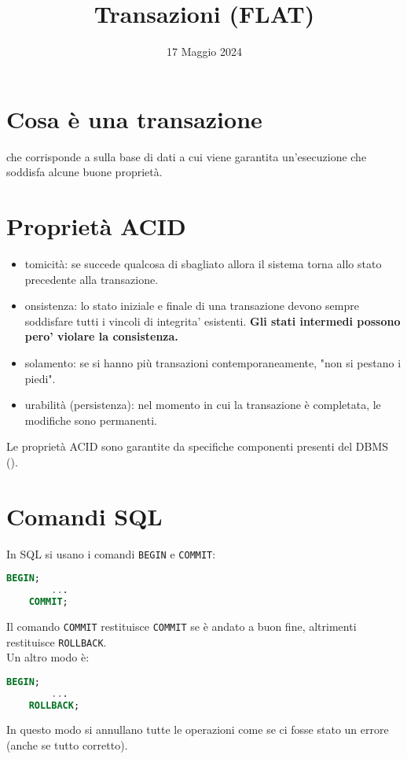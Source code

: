 \documentclass[12pt]{article}
\title{Transazioni (FLAT)}
\date{17 Maggio 2024}
\begin{document}
\maketitle
\section{Cosa è una transazione}
 che corrisponde a  sulla base di dati a cui viene garantita un'esecuzione che soddisfa alcune buone proprietà.
\section{Proprietà ACID}
\begin{itemize}
    \item {}tomicità: se succede qualcosa di sbagliato allora il sistema torna allo stato precedente alla transazione.
    \item {}onsistenza: lo stato iniziale e finale di una transazione devono sempre soddisfare tutti i vincoli di integrita' esistenti. \textbf{Gli stati intermedi possono pero' violare la consistenza.} 
    \item {}solamento: se si hanno più transazioni contemporaneamente, "non si pestano i piedi".
    \item {}urabilità (persistenza): nel momento in cui la transazione è completata, le modifiche sono permanenti. 
\end{itemize}
Le proprietà ACID sono garantite da specifiche componenti presenti del DBMS ().
\section{Comandi SQL}
In SQL si usano i comandi \texttt{BEGIN} e \texttt{COMMIT}:
\begin{lstlisting}[language=SQL]
    BEGIN;
        ...
    COMMIT;
\end{lstlisting}
Il comando \texttt{COMMIT} restituisce \texttt{COMMIT} se è andato a buon fine, altrimenti restituisce \texttt{ROLLBACK}.\\
Un altro modo è:
\begin{lstlisting}[language=SQL]
    BEGIN;
        ...
    ROLLBACK;
\end{lstlisting}
In questo modo si annullano tutte le operazioni come se ci fosse stato un errore (anche se tutto corretto).
\end{document}
